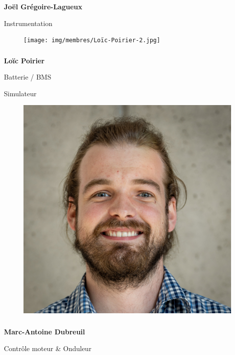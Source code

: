\documentclass[a0paper,portrait]{baposter}
\begin{document}
\begin{poster}
{\subsubsection*{}
\vspace{2mm}
\textbf{Joël Grégoire-Lagueux}

Instrumentation

\begin{figure}
\texttt{[image: img/membres/Loïc-Poirier-2.jpg]} 
\end{figure}
\subsubsection*{}
\vspace{-2mm}
\textbf{Loïc Poirier}

Batterie / BMS

Simulateur

\begin{figure}
\includegraphics[width=.9\linewidth]{img/membres/Marc-Antoine-Dubreuil-2.jpg} 
\end{figure}
\subsubsection*{}
\vspace{-2mm}
\textbf{Marc-Antoine Dubreuil}

Contrôle moteur \& Onduleur

}
\end{poster}
\end{document}
